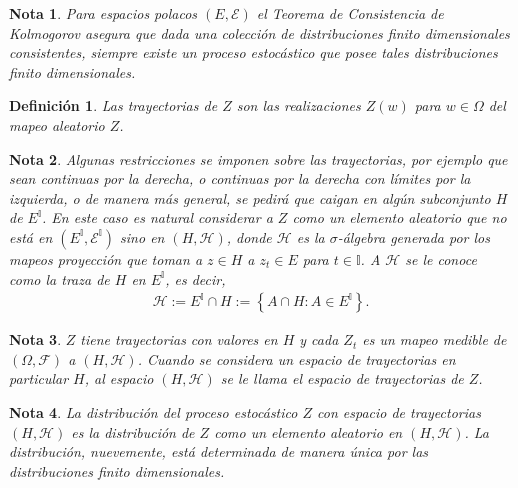\documentclass{article}
\newtheorem{Def}{Definición}[section]
\newtheorem{Note}{Nota}[section]
\numberwithin{equation}{section}
\begin{document}
\begin{Note}
Para espacios polacos $\left(E,\mathcal{E}\right)$ el Teorema de Consistencia de Kolmogorov asegura que dada una colecci\'on de distribuciones finito dimensionales consistentes, siempre existe un proceso estoc\'astico que posee tales distribuciones finito dimensionales.
\end{Note}


\begin{Def}
Las trayectorias de $Z$ son las realizaciones $Z\left(w\right)$ para $w\in\Omega$ del mapeo aleatorio $Z$.
\end{Def}

\begin{Note}
Algunas restricciones se imponen sobre las trayectorias, por ejemplo que sean continuas por la derecha, o continuas por la derecha con l\'imites por la izquierda, o de manera m\'as general, se pedir\'a que caigan en alg\'un subconjunto $H$ de $E^{\mathbb{I}}$. En este caso es natural considerar a $Z$ como un elemento aleatorio que no est\'a en $\left(E^{\mathbb{I}},\mathcal{E}^{\mathbb{I}}\right)$ sino en $\left(H,\mathcal{H}\right)$, donde $\mathcal{H}$ es la $\sigma$-\'algebra generada por los mapeos proyecci\'on que toman a $z\in H$ a $z_{t}\in E$ para $t\in\mathbb{I}$. A $\mathcal{H}$ se le conoce como la traza de $H$ en $E^{\mathbb{I}}$, es decir,
\begin{eqnarray}
\mathcal{H}:=E^{\mathbb{I}}\cap H:=\left\{A\cap H:A\in E^{\mathbb{I}}\right\}.
\end{eqnarray}
\end{Note}

\begin{Note}
$Z$ tiene trayectorias con valores en $H$ y cada $Z_{t}$ es un mapeo medible de $\left(\Omega,\mathcal{F}\right)$ a $\left(H,\mathcal{H}\right)$. Cuando se considera un espacio de trayectorias en particular $H$, al espacio $\left(H,\mathcal{H}\right)$ se le llama el espacio de trayectorias de $Z$.
\end{Note}

\begin{Note}
La distribuci\'on del proceso estoc\'astico $Z$ con espacio de trayectorias $\left(H,\mathcal{H}\right)$ es la distribuci\'on de $Z$ como  un elemento aleatorio en $\left(H,\mathcal{H}\right)$. La distribuci\'on, nuevemente, est\'a determinada de manera \'unica por las distribuciones finito dimensionales.
\end{Note}
\end{document}
